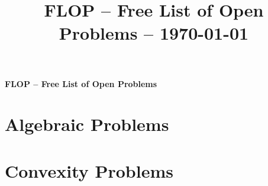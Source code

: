 \documentclass[oneside]{amsbook}
\title{FLOP -- Free List of Open Problems -- \today}
\numberwithin{equation}{section}
\begin{document}
\begin{center}
	\textbf{\huge{FLOP -- Free List of Open Problems}}
	
\end{center}
\tableofcontents









\chapter{Algebraic Problems}










\chapter{Convexity Problems}



%
%
%
\end{document}
